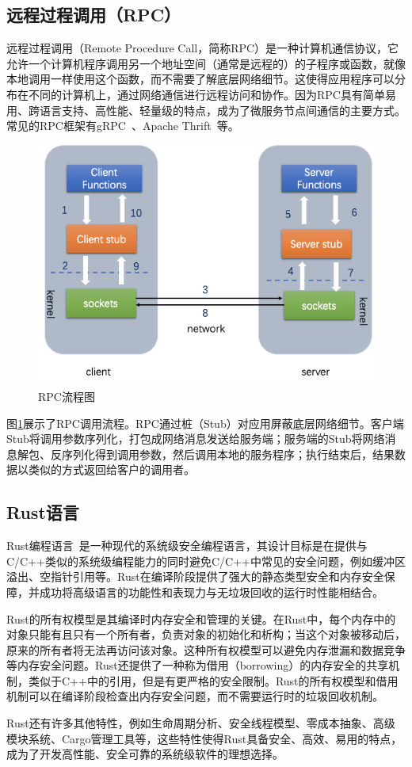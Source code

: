 \subsection{远程过程调用（RPC）}

远程过程调用（Remote Procedure Call，简称RPC）是一种计算机通信协议，它允许一个计算机程序调用另一个地址空间（通常是远程的）的子程序或函数，就像本地调用一样使用这个函数，而不需要了解底层网络细节。这使得应用程序可以分布在不同的计算机上，通过网络通信进行远程访问和协作。因为RPC具有简单易用、跨语言支持、高性能、轻量级的特点，成为了微服务节点间通信的主要方式。常见的RPC框架有gRPC~\cite{grpc}、Apache Thrift~\cite{Thrift}等。

\begin{figure}[!ht]
    \centering
    \includegraphics[width=.55\textwidth]{figures/RPC.png}
    \caption{RPC流程图}
    \label{fig:rpc}
\end{figure}

图\ref{fig:rpc}展示了RPC调用流程。RPC通过桩（Stub）对应用屏蔽底层网络细节。客户端Stub将调用参数序列化，打包成网络消息发送给服务端；服务端的Stub将网络消息解包、反序列化得到调用参数，然后调用本地的服务程序；执行结束后，结果数据以类似的方式返回给客户的调用者。

\subsection{Rust语言}

Rust编程语言~\cite{rust-lang}是一种现代的系统级安全编程语言，其设计目标是在提供与C/C++类似的系统级编程能力的同时避免C/C++中常见的安全问题，例如缓冲区溢出、空指针引用等。Rust在编译阶段提供了强大的静态类型安全和内存安全保障，并成功将高级语言的功能性和表现力与无垃圾回收的运行时性能相结合。

Rust的所有权模型是其编译时内存安全和管理的关键。在Rust中，每个内存中的对象只能有且只有一个所有者，负责对象的初始化和析构；当这个对象被移动后，原来的所有者将无法再访问该对象。这种所有权模型可以避免内存泄漏和数据竞争等内存安全问题。Rust还提供了一种称为借用（borrowing）的内存安全的共享机制，类似于C++中的引用，但是有更严格的安全限制。Rust的所有权模型和借用机制可以在编译阶段检查出内存安全问题，而不需要运行时的垃圾回收机制。

Rust还有许多其他特性，例如生命周期分析、安全线程模型、零成本抽象、高级模块系统、Cargo管理工具等，这些特性使得Rust具备安全、高效、易用的特点，成为了开发高性能、安全可靠的系统级软件的理想选择。
